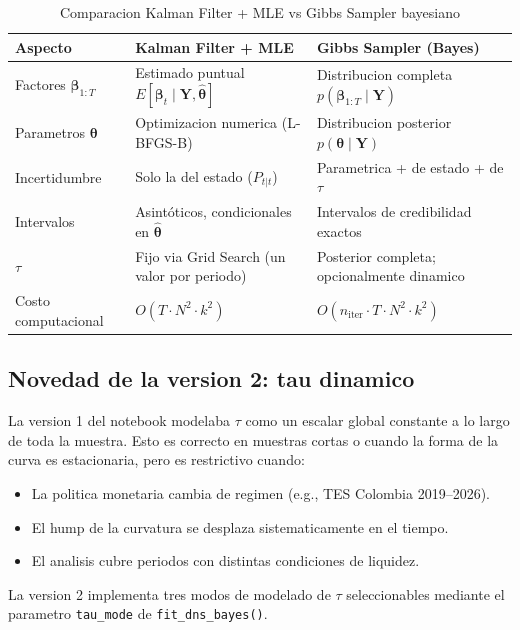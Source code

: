 \documentclass[12pt, a4paper]{article}
\theoremstyle{plain}
\theoremstyle{definition}
\theoremstyle{remark}
\newcommand{\bbet}{\bm{\beta}}
\newcommand{\bY}{\mathbf{Y}}
\begin{document}
\begin{table}[H]
\centering
\caption{Comparacion Kalman Filter + MLE vs Gibbs Sampler bayesiano}
\label{tab:kf_vs_bayes}
\small
\begin{tabular}{L{3.5cm} L{5.2cm} L{5.2cm}}
\toprule
\textbf{Aspecto}
  & \textbf{Kalman Filter + MLE}
  & \textbf{Gibbs Sampler (Bayes)} \\
\midrule
Factores $\bbet_{1:T}$
  & Estimado puntual $E[\bbet_t \mid \bY, \hat{\bm{\theta}}]$
  & Distribucion completa $p(\bbet_{1:T} \mid \bY)$ \\
\addlinespace
Parametros $\bm{\theta}$
  & Optimizacion numerica (L-BFGS-B)
  & Distribucion posterior $p(\bm{\theta} \mid \bY)$ \\
\addlinespace
Incertidumbre
  & Solo la del estado ($P_{t|t}$)
  & Parametrica + de estado + de $\tau$ \\
\addlinespace
Intervalos
  & Asintóticos, condicionales en $\hat{\bm{\theta}}$
  & Intervalos de credibilidad exactos \\
\addlinespace
$\tau$
  & Fijo via Grid Search (un valor por periodo)
  & Posterior completa; opcionalmente dinamico \\
\addlinespace
Costo computacional
  & $O(T \cdot N^2 \cdot k^2)$
  & $O(n_\text{iter} \cdot T \cdot N^2 \cdot k^2)$ \\
\bottomrule
\end{tabular}
\end{table}

\subsection{Novedad de la version 2: tau dinamico}

La version 1 del notebook modelaba $\tau$ como un escalar global constante
a lo largo de toda la muestra. Esto es correcto en muestras cortas o cuando
la forma de la curva es estacionaria, pero es restrictivo cuando:

\begin{itemize}[leftmargin=1.5em]
  \item La politica monetaria cambia de regimen (e.g., TES Colombia 2019--2026).
  \item El hump de la curvatura se desplaza sistematicamente en el tiempo.
  \item El analisis cubre periodos con distintas condiciones de liquidez.
\end{itemize}

La version 2 implementa tres modos de modelado de $\tau$ seleccionables
mediante el parametro \texttt{tau\_mode} de \texttt{fit\_dns\_bayes()}.
\end{document}

